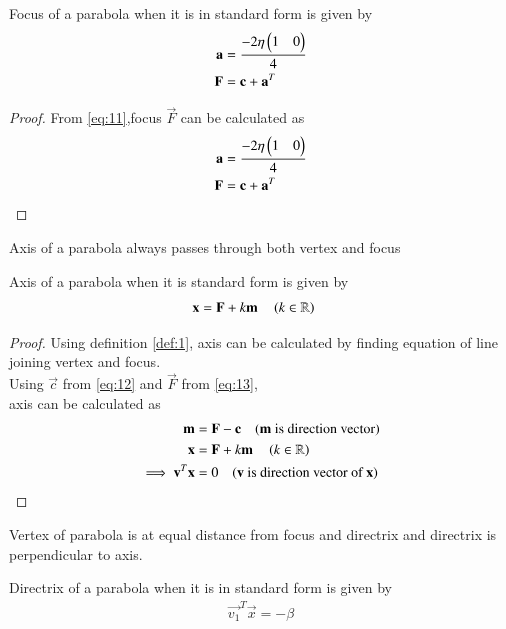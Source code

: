 \documentclass[journal,12pt,twocolumn]{IEEEtran}
\begin{document}
\begin{lemma}
Focus of a parabola when it is in standard form is given by 
\begin{align}
\mathbf{a} &= \frac{-2\eta\begin{pmatrix}1 & 0\end{pmatrix}}{4} 
\\
\mathbf{F} &= \mathbf{c} + \mathbf{a}^T  \label{eq:25}
\end{align}
\end{lemma}
\begin{proof}
From \eqref{eq:11},focus $\vec{F}$ can be calculated as
\begin{align}
\mathbf{a} &= \frac{-2\eta\begin{pmatrix}1 & 0\end{pmatrix}}{4} 
\\
\mathbf{F} &= \mathbf{c} + \mathbf{a}^T  \label{eq:13}
\end{align}
\end{proof}
\begin{definition}
Axis  of  a parabola  always passes through  both  vertex and focus \label{def:1}
\end{definition}
\begin{lemma}
Axis of a parabola when it is standard form is given by
\begin{align}
    \mathbf{x} &= \mathbf{F}+k\mathbf{m} \quad \left(k \in \mathbb{R}\right) \label{eq:26}
\end{align}
\end{lemma}
\begin{proof}
Using definition \ref{def:1}, axis can be calculated by finding equation of line joining vertex and focus.
\\
Using $\vec{c}$ from \eqref{eq:12} and $\vec{F}$ from \eqref{eq:13},
\\
axis can be calculated as
\begin{align}
\mathbf{m} &= \mathbf{F}-\mathbf{c} \quad (\text{$\mathbf{m}$ is direction vector})
\\
\mathbf{x} &= \mathbf{F}+k\mathbf{m} \quad \left(k \in \mathbb{R}\right) \label{eq:14}
\\
\implies \mathbf{v}^T\mathbf{x} &= 0 \quad (\text{$\mathbf{v}$ is direction vector of $\mathbf{x}$}) \label{eq:21}
\end{align}
\end{proof}
\begin{definition}
Vertex  of  parabola  is  at  equal  distance  from focus and directrix and directrix is perpendicular to axis. \label{def:2}
\end{definition}
\begin{lemma}
Directrix of a parabola when it is in standard form is given by
\begin{align}
    \vec{v_1}^T\vec{x} = -\beta 
\end{align}
\end{lemma}
\end{document}
